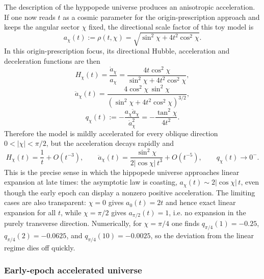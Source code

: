 \documentclass[11pt]{article}
\begin{document}
The description of the hyppopede universe produces an anisotropic acceleration. If one now reads $t$ as a cosmic parameter for the origin-prescription approach and keeps the angular sector $\chi$ fixed, the directional scale factor of this toy model is
\begin{equation}
a_\chi(t):=\rho(t,\chi)=\sqrt{\sin^2\chi+4t^2\cos^2\chi}.
\end{equation}
In this origin-prescription focus, its directional Hubble, acceleration and deceleration functions are then
\begin{equation}
H_\chi(t)=\frac{\dot a_\chi}{a_\chi}=\frac{4t\cos^2\chi}{\sin^2\chi+4t^2\cos^2\chi},
\end{equation}
\begin{equation}
\ddot a_\chi(t)=\frac{4\cos^2\chi\,\sin^2\chi}{\left(\sin^2\chi+4t^2\cos^2\chi\right)^{3/2}},
\end{equation}
\begin{equation}
q_\chi(t):=-\frac{a_\chi\ddot a_\chi}{\dot a_\chi^2}=-\frac{\tan^2\chi}{4t^2}.
\end{equation}
Therefore the model is mildly accelerated for every oblique direction $0<|\chi|<\pi/2$, but the acceleration decays rapidly and
\begin{equation}
H_\chi(t)=\frac{1}{t}+O(t^{-3}),\qquad \ddot a_\chi(t)=\frac{\sin^2\chi}{2|{\cos\chi}|\,t^3}+O(t^{-5}),\qquad q_\chi(t)\to0^-.
\end{equation}
This is the precise sense in which the hippopede universe approaches linear expansion at late times: the asymptotic law is coasting, $a_\chi(t)\sim 2|{\cos\chi}|\,t$, even though the early epoch can display a nonzero positive acceleration. The limiting cases are also transparent: $\chi=0$ gives $a_0(t)=2t$ and hence exact linear expansion for all $t$, while $\chi=\pi/2$ gives $a_{\pi/2}(t)=1$, i.e. no expansion in the purely transverse direction. Numerically, for $\chi=\pi/4$ one finds $q_{\pi/4}(1)=-0.25$, $q_{\pi/4}(2)=-0.0625$, and $q_{\pi/4}(10)=-0.0025$, so the deviation from the linear regime dies off quickly.

\subsubsection*{Early-epoch accelerated universe}
\end{document}
